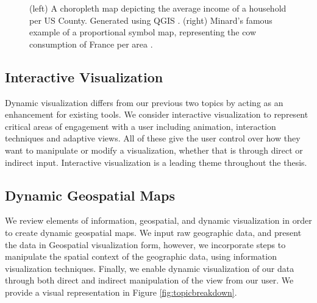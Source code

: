 \begin{figure}[hb]
\centering
{}
\caption{(left) A choropleth map depicting the average income of a household per US County. Generated using QGIS \cite{qgis2015qgis}. (right) Minard's famous example of a proportional symbol map, representing the cow consumption of France per area \cite{minard1858carte}. } \label{fig:geo} 
\end{figure}

\newpage

\subsection{Interactive Visualization}
Dynamic visualization differs from our previous two topics by acting as an enhancement for existing tools. We consider interactive visualization to represent critical areas of engagement with a user including animation, interaction techniques and adaptive views. All of these give the user control over how they want to manipulate or modify a visualization, whether that is through direct or indirect input. Interactive visualization is a leading theme throughout the thesis.

\subsection{Dynamic Geospatial Maps}
We review elements of information, geospatial, and dynamic visualization in order to create dynamic geospatial maps. We input raw geographic data, and present the data in Geospatial visualization form, however, we incorporate steps to manipulate the spatial context of the geographic data, using information visualization techniques. Finally, we enable dynamic visualization of our data through both direct and indirect manipulation of the view from our user. We provide a visual representation in Figure \ref{fig:topicbreakdown}.
\vspace{1.2cm}

